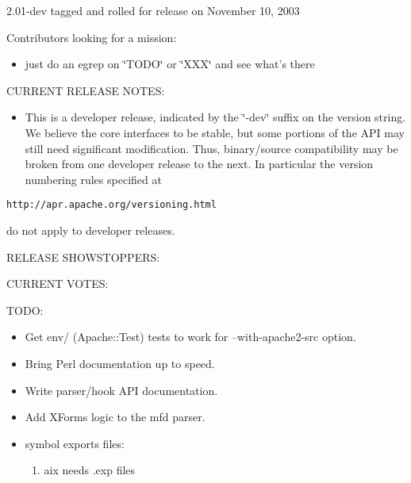 2.01-dev tagged and rolled for release on November 10, 2003

Contributors looking for a mission:

\begin{itemize}
\item just do an egrep on \char`\"{}TODO\char`\"{} or \char`\"{}XXX\char`\"{} and see what's there\end{itemize}


CURRENT RELEASE NOTES:

\begin{itemize}
\item This is a developer release, indicated by the \char`\"{}-dev\char`\"{} suffix on the version string. We believe the core interfaces to be stable, but some portions of the API may still need significant modification. Thus, binary/source compatibility may be broken from one developer release to the next. In particular the version numbering rules specified at\end{itemize}


{\tt http://apr.apache.org/versioning.html}

do not apply to developer releases.

RELEASE SHOWSTOPPERS:

CURRENT VOTES:

TODO:

\begin{itemize}
\item Get env/ (Apache::Test) tests to work for --with-apache2-src option.\end{itemize}


\begin{itemize}
\item Bring Perl documentation up to speed.\end{itemize}


\begin{itemize}
\item Write parser/hook API documentation.\end{itemize}


\begin{itemize}
\item Add XForms logic to the mfd parser.\end{itemize}


\begin{itemize}
\item symbol exports files:\begin{enumerate}
\item aix needs .exp files\end{enumerate}
\end{itemize}


